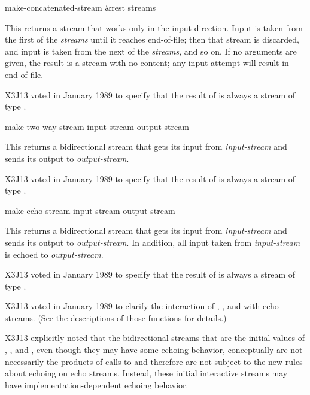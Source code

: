 \begin{defun}[Function]
make-concatenated-stream &rest streams

This returns a stream that works only in the input direction.
Input is taken from the first of the {\it streams} until it reaches
end-of-file; then that stream is discarded, and input is taken
from the next of the {\it streams}, and so on.  If no arguments
are given, the result is a stream with no content; any input attempt
will result in end-of-file.

\begin{new}
X3J13 voted in January 1989
to specify that the result of
 is always a stream of type .
\end{new}
\end{defun}

\begin{defun}[Function]
make-two-way-stream input-stream output-stream

This returns a bidirectional stream that gets its input from {\it input-stream}
and sends its output to {\it output-stream}.

\begin{new}
X3J13 voted in January 1989
to specify that the result of
 is always a stream of type .
\end{new}
\end{defun}

\begin{defun}[Function]
make-echo-stream input-stream output-stream

This returns a bidirectional stream that gets its input from {\it input-stream}
and sends its output to {\it output-stream}.  In addition, all
input taken from {\it input-stream} is echoed to {\it output-stream}.

\begin{new}
X3J13 voted in January 1989
to specify that the result of
 is always a stream of type .
\end{new}

\begin{new}
X3J13 voted in January 1989
to clarify the interaction of
, , and  with echo streams.
(See the descriptions of those functions for details.)

X3J13 explicitly noted that the bidirectional streams that are the initial
values of , , and ,
even though they may have some echoing behavior, conceptually
are not necessarily the products of calls to 
and therefore are not subject to the new rules about echoing on echo
streams.  Instead, these initial interactive streams may have
implementation-dependent echoing behavior.
\end{new}
\end{defun}


